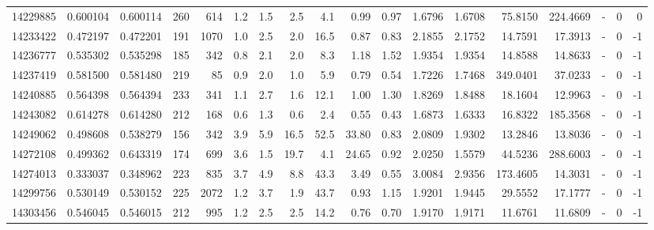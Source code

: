 \begin{tabular}{rrrrrrrrrrrrrrrlrr}
  14229885 & 0.600104 &   0.600114 &  260 &  614 &      1.2 &      1.5 &     2.5 &      4.1 &       0.99 &        0.97 &  1.6796 &  1.6708 &   75.8150 &  224.4669 &             - &        0 &          0 \\
  14233422 & 0.472197 &   0.472201 &  191 & 1070 &      1.0 &      2.5 &     2.0 &     16.5 &       0.87 &        0.83 &  2.1855 &  2.1752 &   14.7591 &   17.3913 &             - &        0 &         -1 \\
  14236777 & 0.535302 &   0.535298 &  185 &  342 &      0.8 &      2.1 &     2.0 &      8.3 &       1.18 &        1.52 &  1.9354 &  1.9354 &   14.8588 &   14.8633 &             - &        0 &         -1 \\
  14237419 & 0.581500 &   0.581480 &  219 &   85 &      0.9 &      2.0 &     1.0 &      5.9 &       0.79 &        0.54 &  1.7226 &  1.7468 &  349.0401 &   37.0233 &             - &        0 &         -1 \\
  14240885 & 0.564398 &   0.564394 &  233 &  341 &      1.1 &      2.7 &     1.6 &     12.1 &       1.00 &        1.30 &  1.8269 &  1.8488 &   18.1604 &   12.9963 &             - &        0 &         -1 \\
  14243082 & 0.614278 &   0.614280 &  212 &  168 &      0.6 &      1.3 &     0.6 &      2.4 &       0.55 &        0.43 &  1.6873 &  1.6333 &   16.8322 &  185.3568 &             - &        0 &         -1 \\
  14249062 & 0.498608 &   0.538279 &  156 &  342 &      3.9 &      5.9 &    16.5 &     52.5 &      33.80 &        0.83 &  2.0809 &  1.9302 &   13.2846 &   13.8036 &             - &        0 &         -1 \\
  14272108 & 0.499362 &   0.643319 &  174 &  699 &      3.6 &      1.5 &    19.7 &      4.1 &      24.65 &        0.92 &  2.0250 &  1.5579 &   44.5236 &  288.6003 &             - &        0 &         -1 \\
  14274013 & 0.333037 &   0.348962 &  223 &  835 &      3.7 &      4.9 &     8.8 &     43.3 &       3.49 &        0.55 &  3.0084 &  2.9356 &  173.4605 &   14.3031 &             - &        0 &         -1 \\
  14299756 & 0.530149 &   0.530152 &  225 & 2072 &      1.2 &      3.7 &     1.9 &     43.7 &       0.93 &        1.15 &  1.9201 &  1.9445 &   29.5552 &   17.1777 &             - &        0 &         -1 \\
  14303456 & 0.546045 &   0.546015 &  212 &  995 &      1.2 &      2.5 &     2.5 &     14.2 &       0.76 &        0.70 &  1.9170 &  1.9171 &   11.6761 &   11.6809 &             - &        0 &         -1 \\

\end{tabular}
